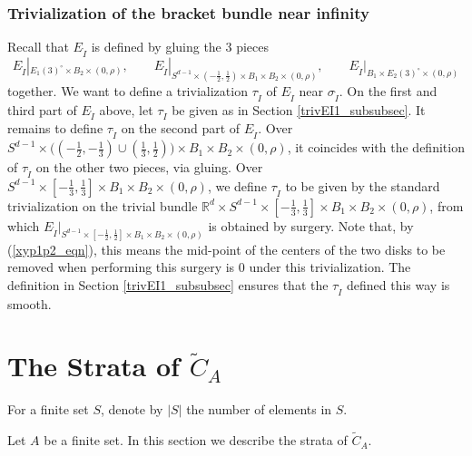\documentclass[11pt]{article}
\theoremstyle{definition}
\theoremstyle{remark}
\def\wt#1{\widetilde{#1}}
\def\R{\mathbb{R}}
\def\rI{{\mathring{I}}}
\begin{document}
\subsubsection{Trivialization of the bracket bundle near infinity}

Recall that $E_\rI$ is defined by gluing the 3 pieces
$$E_\rI|_{E_1(3)^\circ\times B_2\times(0,\rho)},\qquad E_\rI|_{S^{d-1}\times(-\frac{1}{2},\frac{1}{2})\times B_1\times B_2\times (0,\rho)},\qquad E_\rI|_{B_1\times E_2(3)^\circ\times(0,\rho)}$$
together. 
We want to define a trivialization $\tau_\rI$ of $E_\rI$ near $\sigma_\rI$.
On the first and third part of $E_\rI$ above, let $\tau_\rI$ be given as in Section \ref{trivEI1_subsubsec}. 
It remains to define $\tau_\rI$ on the second part of $E_\rI$. 
Over $S^{d-1}\times\big((-\frac{1}{2},-\frac{1}{3})\cup(\frac{1}{3},\frac{1}{2})\big)\times B_1\times B_2\times (0,\rho)$, it coincides with the definition of $\tau_\rI$ on the other two pieces, via gluing. 
Over $S^{d-1}\times[-\frac{1}{3},\frac{1}{3}]\times B_1\times B_2\times (0,\rho)$, 
we define $\tau_\rI$ to be given by the standard trivialization on the trivial bundle $\R^d\times S^{d-1}\times[-\frac{1}{3},\frac{1}{3}]\times B_1\times B_2\times (0,\rho)$, from which $E_\rI|_{S^{d-1}\times[-\frac{1}{2},\frac{1}{2}]\times B_1\times B_2\times (0,\rho)}$ is obtained by surgery. 
Note that, by (\ref{xyp1p2_eqn}), this means the mid-point of the centers of the two disks to be removed when performing this surgery is 0 under this trivialization. 
The definition in Section \ref{trivEI1_subsubsec} ensures that the $\tau_\rI$ defined this way is smooth. 

\section{The Strata of  \texorpdfstring{$\wt{C}_A$}{the big configuration space}}

For a finite set $S$, denote by $|S|$ the number of elements in $S$. 

Let $A$ be a finite set. 
In this section we describe the strata of $\wt{C}_A$. 
\end{document}
